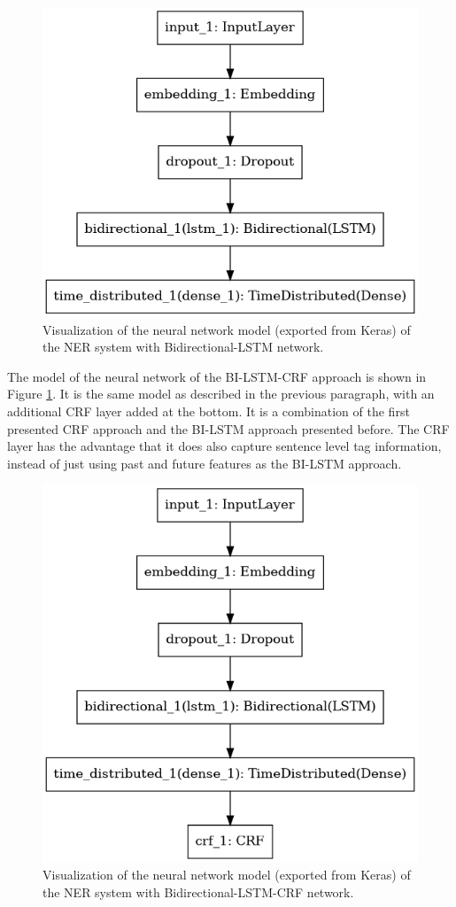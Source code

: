 \documentclass[12pt]{book}
\begin{document}
	\begin{figure}
		\begin{center}
			\includegraphics[width=0.5\linewidth]{img/lstm_model.png}
		\end{center}
		\caption{Visualization of the neural network model (exported from Keras) of the NER system with Bidirectional-LSTM network.}
		\label{fig:lstm}
	\end{figure}

	The model of the neural network of the BI-LSTM-CRF approach is shown in Figure \ref{fig:lstm}. It is the same model as described in the previous paragraph, with an additional CRF layer added at the bottom. It is a combination of the first presented CRF approach and the BI-LSTM approach presented before. The CRF layer has the advantage that it does also capture sentence level tag information, instead of just using past and future features as the BI-LSTM approach.
	
	\begin{figure}
		\begin{center}
			\includegraphics[width=0.5\linewidth]{img/lstm_crf_model.png}
		\end{center}
		\caption{Visualization of the neural network model (exported from Keras) of the NER system with Bidirectional-LSTM-CRF network.}
		\label{fig:lstm-crf}
	\end{figure}
	
\end{document}
